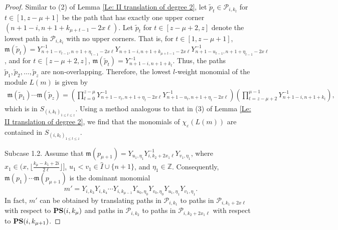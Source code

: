 \documentclass[12pt, reqno]{amsart}
\numberwithin{equation}{section}
\begin{document}
{\begin{proof}
Similar to (2) of Lemma \ref{Le: II translation of degree 2}, let $\widetilde{p}_t\in \mathscr{P}_{i,k_t}$ for $t \in [1, z-\mu+1]$ be the path that has exactly one upper corner $(n+1-i,n+1+k_{\mu+t-1}-2x \ell)$. Let $\widetilde{p}_t$ for $t\in[z-\mu+2, z]$ denote the lowest path in $\mathscr{P}_{i,k_t}$ with no upper corners. That is, for $t \in [1, z-\mu+1]$, $\mathfrak{m}(\widetilde{p}_{t})=Y_{n+1-v_{t-1},n+1+\eta_{t-1}-2x \ell}^{-1}Y_{n+1-i,n+1+k_{\mu+t-1}-2x \ell}Y_{n+1-u_{t-1}, n+1+\eta_{t-1}-2x \ell}^{-1}$, and for $t\in[z-\mu+2, z]$, $\mathfrak{m}(\widetilde{p}_{t})=Y_{n+1-i,n+1+k_t}^{-1}$. Thus, the paths $\widetilde{p}_{1}, \widetilde{p}_{2}, \ldots, \widetilde{p}_{z}$ are non-overlapping. Therefore, the lowest $l$-weight monomial of the module $L(m)$ is given by 
\begin{align*}
\mathfrak{m}(\widetilde{p}_{1})\cdots \mathfrak{m}(\widetilde{p}_{z})=\left(\prod_{t=0}^{z-\mu}Y_{n+1-v_t,n+1+\eta_t-2x \ell}^{-1}Y_{n+1-u_t,n+1+\eta_t-2x \ell}^{-1}\right)\left(\prod_{t=z-\mu+2}^{\mu-1}Y_{n+1-i,n+1+k_{t}}^{-1}\right),
\end{align*}
which is in $S_{(i,k_t)_{1 \leq t \leq z}}$. Using a method analogous to that in (3) of Lemma \ref{Le: II translation of degree 2}, we find that the monomials of $\chi_\varepsilon(L(m))$ are contained in $S_{(i,k_t)_{1 \leq t \leq z}}$.






Subcase 1.2. Assume that $\mathfrak{m}(p_{\mu+1})=Y_{u_1,\eta_1}Y_{i,k_2+2x_1\ell}^{-1}Y_{v_1,\eta_1}$, where $x_1\in (x,\lfloor\frac{k_\mu-k_1+2i}{2 \ell}\rfloor]$, $u_1<v_1 \in \hat{I} \cup \{n+1\}$, and $\eta_1\in \mathbb{Z}$. Consequently, $\mathfrak{m}(p_1)\cdots \mathfrak{m}(p_{\mu+1})$ is the dominant monomial
\[
m'=Y_{i,k_{3}}Y_{i,k_4}\cdots Y_{i,k_{\mu-1}} Y_{u_0,\eta_0}Y_{v_0,\eta_0} Y_{u_1,\eta_1}Y_{v_1,\eta_1}.
\]
In fact, $m'$ can be obtained by translating paths in $\mathscr{P}_{i,k_1}$ to paths in $\mathscr{P}_{i,k_1+2x \ell}$ with respect to ${\bf PS}(i,k_{\mu})$ and paths in $\mathscr{P}_{i,k_2}$ to paths in $\mathscr{P}_{i,k_2+2x_1 \ell}$ with respect to ${\bf PS}(i,k_{\mu+1})$.


\end{proof}}
\end{document}
